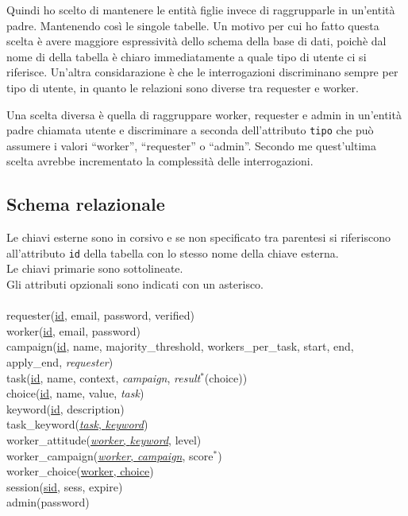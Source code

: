 \documentclass[a4paper]{article}
\begin{document}
Quindi ho scelto di mantenere le entit\`a figlie invece di raggrupparle in un'entit\`a padre. Mantenendo cos\`i le singole tabelle.
Un motivo per cui ho fatto questa scelta \`e 
avere maggiore espressivit\`a dello schema della base di dati, poich\`e dal nome di della tabella \`e chiaro immediatamente a quale tipo di utente ci si riferisce.
Un'altra considarazione \`e che le interrogazioni discriminano sempre per tipo di utente, in quanto le relazioni sono diverse tra requester e worker. 

Una scelta diversa \`e quella di raggruppare worker, requester e admin in un'entit\`a padre chiamata utente e discriminare a seconda dell'attributo \verb|tipo| che pu\`o assumere i valori ``worker'', ``requester'' o ``admin''.
Secondo me quest'ultima scelta avrebbe incrementato la complessit\`a delle interrogazioni.

\subsection{Schema relazionale}
Le chiavi esterne sono in corsivo e se non specificato tra parentesi si riferiscono all'attributo \verb|id| della tabella con lo stesso nome della chiave esterna.\\
Le chiavi primarie sono sottolineate.\\
Gli attributi opzionali sono indicati con un asterisco.
\\\\
requester(\underline{id}, email, password, verified)
\\
worker(\underline{id}, email, password)
\\
campaign(\uline{id}, name, majority\_threshold, workers\_per\_task, start, end, apply\_end, \textit{requester})
\\
task(\uline{id}, name, context, \textit{campaign}, \textit{result}$^*$(choice))
\\
choice(\uline{id}, name, value, \textit{task})
\\
keyword(\uline{id}, description)
\\
task\_keyword(\uline{\textit{task}, \textit{keyword}})
\\
worker\_attitude(\uline{\textit{worker}, \textit{keyword}}, level)
\\
worker\_campaign(\uline{\textit{worker}, \textit{campaign}}, score$^{*}$)
\\
worker\_choice(\uline{worker, choice})
\\
session(\uline{sid}, sess, expire)
\\
admin(password)
\end{document}
